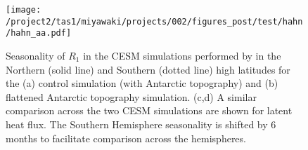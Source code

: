 \documentclass{ametsocV5}
\begin{document}
\begin{figure}[t]
    \noindent\texttt{[image: /project2/tas1/miyawaki/projects/002/figures\_post/test/hahn/hahn\_aa.pdf]}\\
    \caption{Seasonality of $R_1$ in the CESM simulations performed by \cite{hahn2020} in the Northern (solid line) and Southern (dotted line) high latitudes for the (a) control simulation (with Antarctic topography) and (b) flattened Antarctic topography simulation. (c,d) A similar comparison across the two CESM simulations are shown for latent heat flux. The Southern Hemisphere seasonality is shifted by 6 months to facilitate comparison across the hemispheres.}
    \label{fig:hahn-aa}
\end{figure}

\end{document}

